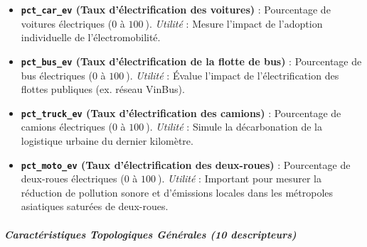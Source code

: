 \documentclass[10pt, a4paper]{article}
\providecommand{\tightlist}{}
\begin{document}
\begin{itemize}
\tightlist
\item
  \textbf{\texttt{pct\_car\_ev} (Taux d'électrification des voitures)} :
  Pourcentage de voitures électriques (\(0\) à \(100\ %
  \)). \emph{Utilité} : Mesure l'impact de l'adoption individuelle de
  l'électromobilité.
\item
  \textbf{\texttt{pct\_bus\_ev} (Taux d'électrification de la flotte de
  bus)} : Pourcentage de bus électriques (\(0\) à \(100\ %
  \)). \emph{Utilité} : Évalue l'impact de l'électrification des flottes
  publiques (ex. réseau VinBus).
\item
  \textbf{\texttt{pct\_truck\_ev} (Taux d'électrification des camions)}
  : Pourcentage de camions électriques (\(0\) à \(100\ %
  \)). \emph{Utilité} : Simule la décarbonation de la logistique urbaine
  du dernier kilomètre.
\item
  \textbf{\texttt{pct\_moto\_ev} (Taux d'électrification des
  deux-roues)} : Pourcentage de deux-roues électriques (\(0\) à \(100\ %
  \)). \emph{Utilité} : Important pour mesurer la réduction de pollution
  sonore et d'émissions locales dans les métropoles asiatiques saturées
  de deux-roues.
\end{itemize}

\subparagraph{Caractéristiques Topologiques Générales (10
descripteurs)}\label{caractuxe9ristiques-topologiques-guxe9nuxe9rales-10-descripteurs-1}
\end{document}
